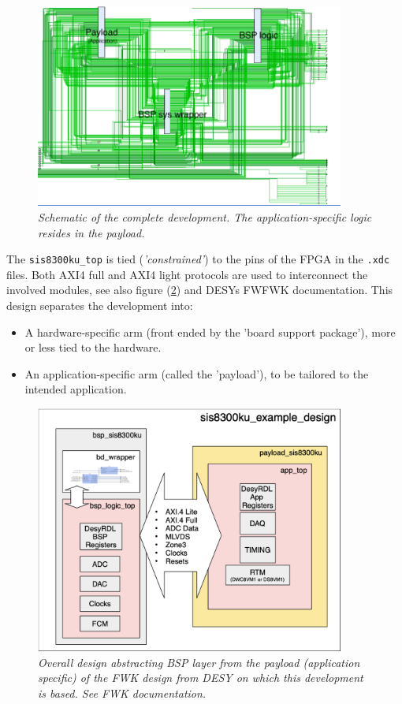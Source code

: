 \documentclass[12pt]{amsart}
\begin{document}
\begin{figure}[htbp] %
   \centering
   \includegraphics[width=4in]{im/schematic_dev4.png} 
   \caption{\em Schematic of the complete development. The application-specific logic resides in the {\em payload}.}
   \label{fig:schema}
\end{figure}


The \verb|sis8300ku_top| is tied ({\em 'constrained'}) to the pins of the FPGA in the \verb|.xdc| files.
Both AXI4 full and AXI4 light protocols are used to interconnect the involved modules,
see also  figure (\ref{fig:fwk}) and DESYs FWFWK documentation.
This design separates the development into:
\begin{itemize}
\item A hardware-specific arm (front ended by the 'board support package'), more or less tied to the hardware.
\item An application-specific arm (called the 'payload'), to be tailored to the intended application.
\end{itemize}

\begin{figure}[htbp] %
   \centering
   \includegraphics[width=4in]{im/fwfwk.png} 
   \caption{\em Overall design abstracting BSP layer from the payload (application specific) 
   	of the FWK design from DESY on which this development is based. 
	See FWK documentation.}
   \label{fig:fwk}
\end{figure}
\end{document}
